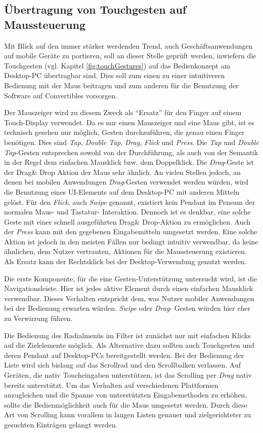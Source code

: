 \subsection{Übertragung von Touchgesten auf Maussteuerung} \label{sec:analyseGesten}
Mit Blick auf den immer stärker werdenden Trend, auch Geschäftsanwendungen auf mobile Geräte zu portieren, soll an dieser Stelle geprüft werden, inwiefern die Touchgesten (vgl. Kapitel \ref{fig:touchGestures}) auf das Bedienkonzept am Desktop-PC übertragbar sind. Dies soll zum einen zu einer intuitiveren Bedienung mit der Maus beitragen und zum anderen für die Benutzung der Software auf Convertibles vorsorgen.\par
Der Mauszeiger wird zu diesem Zweck als \enquote{Ersatz} für den Finger auf einem Touch-Display verwendet. Da es nur einen Mauszeiger und eine Maus gibt, ist es technisch gesehen nur möglich, Gesten durchzuführen, die genau einen Finger benötigen. Dies sind \textit{Tap}, \textit{Double Tap}, \textit{Drag}, \textit{Flick} und \textit{Press}. Die \textit{Tap} und \textit{Double Tap}-Gesten entsprechen sowohl von der Durchführung, als auch von der Semantik in der Regel dem einfachen Mausklick bzw. dem Doppelklick. Die \textit{Drag}-Geste ist der Drag\& Drop Aktion der Maus sehr ähnlich. An vielen Stellen jedoch, an denen bei mobilen Anwendungen \textit{Drag}-Gesten verwendet werden würden, wird die Benutzung eines UI-Elements auf dem Desktop-PC mit anderen Mitteln gelöst. Für den \textit{Flick}, auch \textit{Swipe} genannt, existiert kein Pendant im Pensum der normalen Maus- und Tastatur- Interaktion. Dennoch ist es denkbar, eine solche Geste mit einer schnell ausgeführten Drag\& Drop-Aktion zu ermöglichen. Auch der \textit{Press} kann mit den gegebenen Eingabemitteln umgesetzt werden. Eine solche Aktion ist jedoch in den meisten Fällen nur bedingt intuitiv verwendbar, da keine ähnlichen, dem Nutzer vertrauten, Aktionen für die Maussteuerung existieren. Als Ersatz kann der Rechtsklick bei der Desktop-Verwendung genutzt werden.\par
Die erste Komponente, für die eine Gesten-Unterstützung untersucht wird, ist die Navigationsleiste. Hier ist jedes aktive Element durch einen einfachen Mausklick verwendbar. Dieses Verhalten entspricht dem, was Nutzer mobiler Anwendungen bei der Bedienung erwarten würden. \textit{Swipe} oder \textit{Drag}- Gesten würden hier eher zu Verwirrung führen.\par
Die Bedienung des Radialmenüs im Filter ist zunächst nur mit einfachen Klicks auf die Zielelemente möglich. Als Alternative dazu sollten auch Touchgesten und deren Pendant auf Desktop-PCs bereitgestellt werden. Bei der Bedienung der Liste wird sich bislang auf das Scrollrad und den Scrollbalken verlassen. Auf Geräten, die nativ Toucheingaben unterstützen, ist das Scrolling per \textit{Drag} nativ bereits unterstützt. Um das Verhalten auf verschiedenen Plattformen anzugleichen und die Spanne von unterstützten Eingabemethoden zu erhöhen, sollte die Bedienmöglichkeit auch für die Maus umgesetzt werden. Durch diese Art von Scrolling kann vorallem in langen Listen genauer und zielgerichteter zu gesuchten Einträgen gelangt werden.\par %
